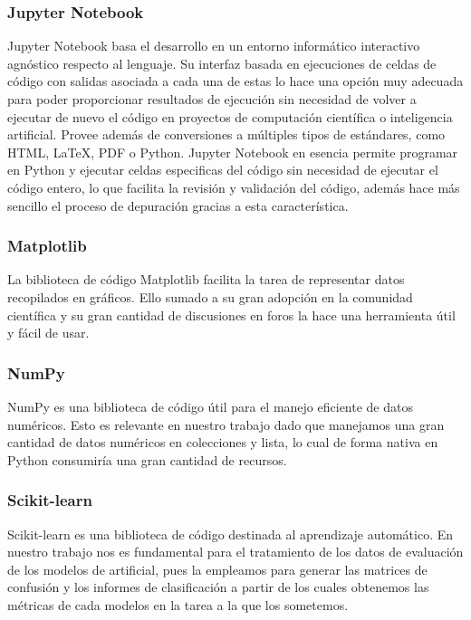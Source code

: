 \documentclass[12pt, a4paper, twoside]{article}
\begin{document}
\subsubsection{Jupyter Notebook}
Jupyter Notebook basa el desarrollo en un entorno informático interactivo agnóstico respecto al lenguaje. Su interfaz basada en ejecuciones de celdas de código con salidas asociada a cada una de estas lo hace una opción muy adecuada para poder proporcionar resultados de ejecución sin necesidad de volver a ejecutar de nuevo el código en proyectos de computación científica o inteligencia artificial. Provee además de conversiones a múltiples tipos de estándares, como HTML, LaTeX, PDF o Python. Jupyter Notebook en esencia permite programar en Python y ejecutar celdas especificas del código sin necesidad de ejecutar el código entero, lo que facilita la revisión y validación del código, además hace más sencillo el proceso de depuración gracias a esta característica.

\subsubsection{Matplotlib}
La biblioteca de código Matplotlib facilita la tarea de representar datos recopilados en gráficos. Ello sumado a su gran adopción en la comunidad científica y su gran cantidad de discusiones en foros la hace una herramienta útil y fácil de usar.

\subsubsection{NumPy}
NumPy es una biblioteca de código útil para el manejo eficiente de datos numéricos. Esto es relevante en nuestro trabajo dado que manejamos una gran cantidad de datos numéricos en colecciones y lista, lo cual de forma nativa en Python consumiría una gran cantidad de recursos.

\subsubsection{Scikit-learn}
Scikit-learn es una biblioteca de código destinada al aprendizaje automático. En nuestro trabajo nos es fundamental para el tratamiento de los datos de evaluación de los modelos de artificial, pues la empleamos para generar las matrices de confusión y los informes de clasificación a partir de los cuales obtenemos las métricas de cada modelos en la tarea a la que los sometemos.


\end{document}
